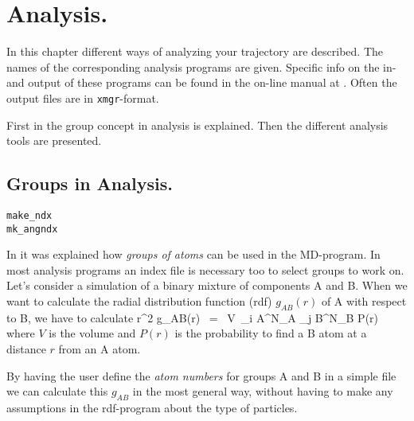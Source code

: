 %
% 
% 
% 
% 
% 
% 
% 
% 
%

\chapter{Analysis.}
\label{ch:analysis}
In this chapter different ways of analyzing your trajectory are described. 
The names of the corresponding analysis programs are given. 
Specific info on the in- and output of these programs can be found 
in the on-line manual at {\wwwpage}.
Often the output files are in {\tt xmgr}-format.

First in  the group concept in analysis is explained. 
Then the different analysis tools are presented.


\section{Groups in Analysis.}
\label{sec:groups}
\begin{verbatim}
make_ndx
mk_angndx
\end{verbatim}
In  it was explained how {\em groups of
atoms} can be used in the MD-program.  In most analysis programs an
index file is necessary too to select groups to work on. Let's
consider a simulation of a binary mixture of components A and B. When
we want to calculate the radial distribution function (rdf)
$g_{AB}(r)$ of A with respect to B, we have to calculate
\pi r^2 g_{AB}(r)	~=~	V~\sum_{i \in A}^{N_A} \sum_{j \in B}^{N_B} P(r)
\eeq
where $V$ is the volume and $P(r)$ is the probability to find a B atom
at a distance $r$ from an A atom.

By having the user define the {\em atom numbers} for groups A and B in
a simple file we can calculate this $g_{AB}$ in the most general way, without
having to make any assumptions in the rdf-program about the type of 
particles. 

